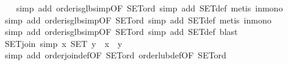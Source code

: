 \begin{isabellebody}
\ \ \isamarkupfalse%
\ {}simp\ add{}\ order{}is{}glb{}simp{}OF\ SET{}ord{}{}\ simp\ add{}\ SET{}def{}\ metis\ in{}mono{}\isanewline
\ \ \isamarkupfalse%
\ {}simp\ add{}\ order{}is{}glb{}simp{}OF\ SET{}ord{}{}\ simp\ add{}\ SET{}def{}\ metis\ in{}mono{}\isanewline
\ \ \isamarkupfalse%
\ {}simp\ add{}\ order{}is{}glb{}simp{}OF\ SET{}ord{}{}\ simp\ add{}\ SET{}def{}\ blast{}\isanewline
\ \ \isamarkupfalse%
%
\endisatagproof
{\isafoldproof}%
%
\isadelimproof
\isanewline
%
\endisadelimproof
\isanewline
{}\isamarkupfalse%
\ SET{}join\ {}simp{}{}\ {}x\ {}\isactrlbsub SET\isactrlesub \ y\ {}\ x\ {}\ y{}\isanewline
%
\isadelimproof
\ \ %
\endisadelimproof
%
\isatagproof
{}\isamarkupfalse%
\ {}simp\ add{}\ order{}join{}def{}OF\ SET{}ord{}\ order{}lub{}def{}OF\ SET{}ord{}{}\isanewline

\end{isabellebody}
